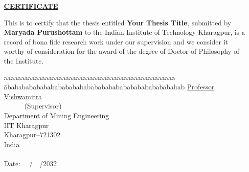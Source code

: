 \newpage
\thispagestyle{empty}
 \vspace*{3cm}
\begin{center}
\textbf{\Large\underline {CERTIFICATE}}
\end{center}
\vspace{1cm}
 This is to certify that the thesis entitled \textbf{Your Thesis Title}, submitted by \textbf{Maryada Purushottam} to the Indian Institute of Technology Kharagpur, is a record of bona fide research work under our supervision and we consider it worthy of consideration for the award of the degree of Doctor of Philosophy of the Institute.
\vspace{2.cm}
\begin{tabbing}
aaaaaaaaaaaaaaaaaaaaaaaaaaaaaaaaaaaaaaaaaaaaaaaaaa \= ababababababababababababababababababababababababab \kill
{\underline{Professor Vishwamitra}}\\
~~~~~~(Supervisor)\\
Department of Mining Engineering\\
IIT Kharagpur\\
Kharagpur--721302\\
India\\\\
Date: \ \ /\ \ /2032\\
\end{tabbing} 